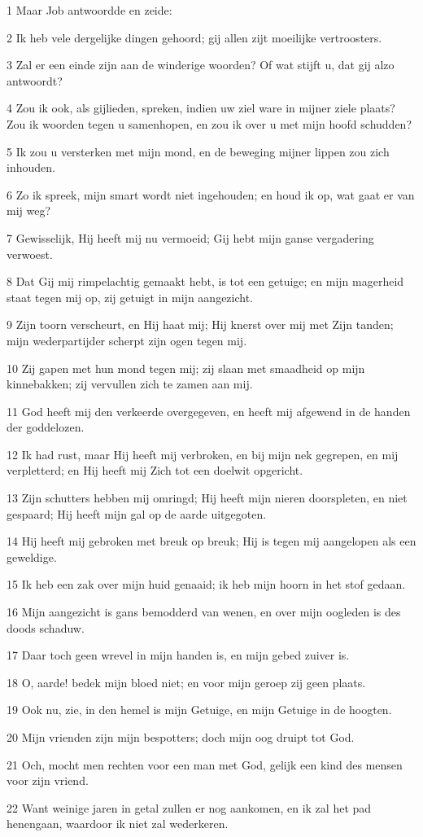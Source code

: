\par 1 Maar Job antwoordde en zeide:
\par 2 Ik heb vele dergelijke dingen gehoord; gij allen zijt moeilijke vertroosters.
\par 3 Zal er een einde zijn aan de winderige woorden? Of wat stijft u, dat gij alzo antwoordt?
\par 4 Zou ik ook, als gijlieden, spreken, indien uw ziel ware in mijner ziele plaats? Zou ik woorden tegen u samenhopen, en zou ik over u met mijn hoofd schudden?
\par 5 Ik zou u versterken met mijn mond, en de beweging mijner lippen zou zich inhouden.
\par 6 Zo ik spreek, mijn smart wordt niet ingehouden; en houd ik op, wat gaat er van mij weg?
\par 7 Gewisselijk, Hij heeft mij nu vermoeid; Gij hebt mijn ganse vergadering verwoest.
\par 8 Dat Gij mij rimpelachtig gemaakt hebt, is tot een getuige; en mijn magerheid staat tegen mij op, zij getuigt in mijn aangezicht.
\par 9 Zijn toorn verscheurt, en Hij haat mij; Hij knerst over mij met Zijn tanden; mijn wederpartijder scherpt zijn ogen tegen mij.
\par 10 Zij gapen met hun mond tegen mij; zij slaan met smaadheid op mijn kinnebakken; zij vervullen zich te zamen aan mij.
\par 11 God heeft mij den verkeerde overgegeven, en heeft mij afgewend in de handen der goddelozen.
\par 12 Ik had rust, maar Hij heeft mij verbroken, en bij mijn nek gegrepen, en mij verpletterd; en Hij heeft mij Zich tot een doelwit opgericht.
\par 13 Zijn schutters hebben mij omringd; Hij heeft mijn nieren doorspleten, en niet gespaard; Hij heeft mijn gal op de aarde uitgegoten.
\par 14 Hij heeft mij gebroken met breuk op breuk; Hij is tegen mij aangelopen als een geweldige.
\par 15 Ik heb een zak over mijn huid genaaid; ik heb mijn hoorn in het stof gedaan.
\par 16 Mijn aangezicht is gans bemodderd van wenen, en over mijn oogleden is des doods schaduw.
\par 17 Daar toch geen wrevel in mijn handen is, en mijn gebed zuiver is.
\par 18 O, aarde! bedek mijn bloed niet; en voor mijn geroep zij geen plaats.
\par 19 Ook nu, zie, in den hemel is mijn Getuige, en mijn Getuige in de hoogten.
\par 20 Mijn vrienden zijn mijn bespotters; doch mijn oog druipt tot God.
\par 21 Och, mocht men rechten voor een man met God, gelijk een kind des mensen voor zijn vriend.
\par 22 Want weinige jaren in getal zullen er nog aankomen, en ik zal het pad henengaan, waardoor ik niet zal wederkeren.

